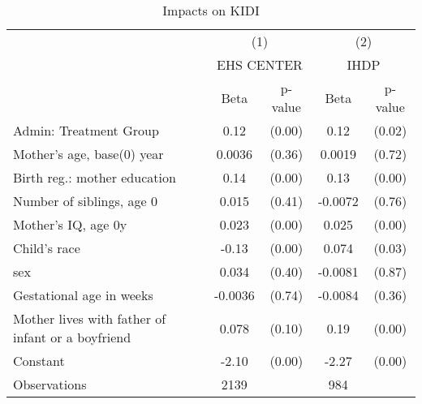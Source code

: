 \begin{table}[htbp]\centering
\def\sym#1{\ifmmode^{#1}\else\(^{#1}\)\fi}
\caption{Impacts on KIDI}
\begin{tabular}{l*{2}{cc}}
\hline\hline
                    &\multicolumn{2}{c}{(1)}  &\multicolumn{2}{c}{(2)}  \\
                    &\multicolumn{2}{c}{EHS CENTER}&\multicolumn{2}{c}{IHDP} \\
                    &        Beta&     p-value&        Beta&     p-value\\
\hline
Admin: Treatment Group&        0.12&      (0.00)&        0.12&      (0.02)\\
Mother's age, base(0) year&      0.0036&      (0.36)&      0.0019&      (0.72)\\
Birth reg.: mother education&        0.14&      (0.00)&        0.13&      (0.00)\\
Number of siblings, age 0&       0.015&      (0.41)&     -0.0072&      (0.76)\\
Mother's IQ, age 0y &       0.023&      (0.00)&       0.025&      (0.00)\\
Child's race        &       -0.13&      (0.00)&       0.074&      (0.03)\\
sex                 &       0.034&      (0.40)&     -0.0081&      (0.87)\\
Gestational age in weeks&     -0.0036&      (0.74)&     -0.0084&      (0.36)\\
Mother lives with father of infant or a boyfriend&       0.078&      (0.10)&        0.19&      (0.00)\\
Constant            &       -2.10&      (0.00)&       -2.27&      (0.00)\\
\hline
Observations        &        2139&            &         984&            \\
\hline\hline
\end{tabular}
\end{table}

